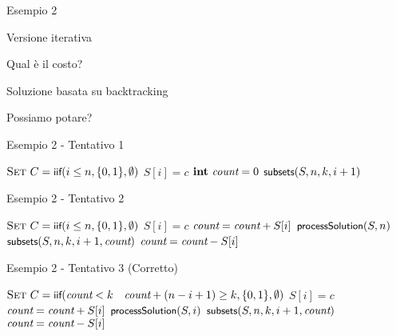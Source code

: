 \begin{frame}{Esempio 2}


\BIL
\item Versione iterativa
\BI
\item Qual è il costo?
\EI
\item Soluzione basata su backtracking
\BI
\item Possiamo potare?
\EI
\EIL


\end{frame}

\begin{frame}{Esempio 2 - Tentativo 1}

\begin{Procedure}
\caption[A]{\enumerasottoinsiemi($\INTEGER[\,]\ S$, \INTEGER $n$, \INTEGER $k$, \INTEGER $i$)}
$\textsc{Set}\ C = \textsf{{\small iif}}(i \leq n, \{ 0, 1 \}, \emptyset)$\;
{
  $S[i] = c$\;
  {
    $\INTEGER\ \Count = 0$\;
  }
  $\textsf{{\small subsets}}(S, n, k, i+1)$\;
}
\end{Procedure}

\end{frame}

\begin{frame}{Esempio 2 - Tentativo 2}
	
\begin{Procedure}
\caption[A]{\enumerasottoinsiemi($\INTEGER[\,]\ S$, \INTEGER $n$, \INTEGER $k$, \INTEGER $i$, \INTEGER \Count)}
$\textsc{Set}\ C = \textsf{{\small iif}}(i \leq n, \{ 0, 1 \}, \emptyset)$\;
{
  $S[i] = c$\;
  $\textit{count} = \textit{count} + S[i]$\;
  {
    $\textsf{{\small processSolution}}(S,n)$\;
  }
  $\textsf{{\small subsets}}(S, n, k, i+1, \textit{count})$\;
  $\textit{count} = \textit{count} - S[i]$\;
}
\end{Procedure}


\end{frame}

\begin{frame}{Esempio 2 - Tentativo 3 (Corretto)}

\begin{Procedure}
\caption[A]{\enumerasottoinsiemi($\INTEGER[\,]\ S$, \INTEGER $n$, \INTEGER $k$, \INTEGER $i$, \INTEGER \Count)}
$\textsc{Set}\ C = \textsf{{\small iif}}(\textit{count} < k$ \AND\ $\textit{count} + (n-i+1) \geq k, \{ 0, 1 \}, \emptyset)$\;
{
  $S[i] = c$\;
  $\textit{count} = \textit{count} + S[i]$\;
  {
    $\textsf{{\small processSolution}}(S,i)$\;
  }{
    $\textsf{{\small subsets}}(S, n, k, i+1, \textit{count})$\;
  }
  $\textit{count} = \textit{count} - S[i]$\;
}
\end{Procedure}

\end{frame}

